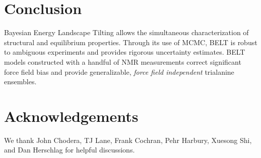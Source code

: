 \documentclass[11pt,titlepage]{article}
\begin{document}
\section*{Conclusion}

Bayesian Energy Landscape Tilting allows the simultaneous characterization of structural and equilibrium properties.  Through its use of MCMC, BELT is robust to ambiguous experiments and provides rigorous uncertainty estimates.  BELT models constructed with a handful of NMR measurements correct significant force field bias and provide generalizable, \emph{force field independent} trialanine ensembles.  


\section*{Acknowledgements}

We thank John Chodera, TJ Lane, Frank Cochran, Pehr Harbury, Xuesong Shi, and Dan Herschlag for helpful discussions.  


\end{document}
